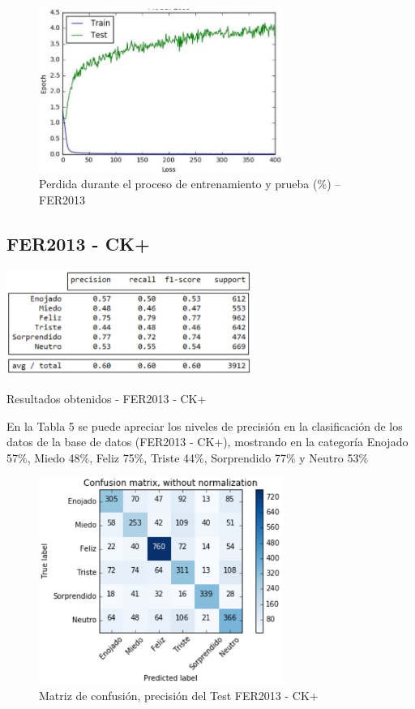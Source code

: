 \begin{figure}[H]
		\centering
		\includegraphics[width=80mm]{Imagenes/perdida_ck+.png}
		\caption{Perdida durante el proceso de entrenamiento y prueba (\%) – FER2013}
		\label{fig:perdida_ck+}
\end{figure}

\subsection{FER2013 - CK+}


\begin{table}[H]
    \centering
    \includegraphics[width=80mm]{Imagenes/tabla_resultados_fer_ck+.png} 
    \caption{Resultados obtenidos - FER2013 - CK+}
    \label{tab:tabla_resultados_fer_ck+}
\end{table}

En la Tabla 5 se puede apreciar los niveles de precisión en la clasificación de los
datos de la base de datos (FER2013 - CK+), mostrando en la categoría Enojado 57\%,
Miedo 48\%, Feliz 75\%, Triste 44\%, Sorprendido 77\% y Neutro 53\%

\begin{figure}[H]
		\centering
		\includegraphics[width=80mm]{Imagenes/matriz_confusion_fer_ck+.png}
		\caption{Matriz de confusión, precisión del Test FER2013 - CK+}
		\label{fig:matriz_confusion_fer_ck+}
\end{figure}

